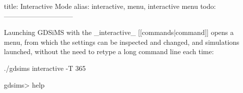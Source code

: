 title: Interactive Mode
alias: interactive, menu, interactive menu
todo:
------------------------------

Launching GDSiMS with the _interactive_ [[commands|command]] opens a menu, from which the settings can be inspected and changed, and simulations launched, without the need to retype a long command line each time:

\begin{Code}
	./gdsims interactive -T 365

	gdsims> help
\end{Code}

%
%
%
%
